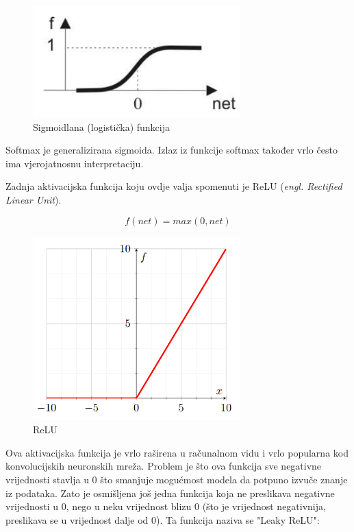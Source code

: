 \begin{figure}[H]
\centering
\includegraphics[width=8cm]{img/Sigmoid.png}
\caption{Sigmoidlana (logistička) funkcija}
\label{img:sigmoid}
\end{figure}

Softmax je generalizirana sigmoida. Izlaz iz funkcije softmax također vrlo često ima vjerojatnosnu interpretaciju. 

Zadnja aktivacijska funkcija koju ovdje valja spomenuti je ReLU (\textit{engl. Rectified Linear Unit}). 

\begin{equation}
f(net) = max(0, net)
\label{eq:relu}
\end{equation}

\begin{figure}[H]
\centering
\includegraphics[width=8cm]{img/ReLU.png}
\caption{ReLU}
\label{img:relu}
\end{figure}

Ova aktivacijska funkcija je vrlo raširena u računalnom vidu i vrlo popularna kod konvolucijskih neuronskih mreža. Problem je što ova funkcija sve negativne vrijednosti stavlja u $0$ što smanjuje mogućmost modela da potpuno izvuče znanje iz podataka. Zato je osmišljena još jedna funkcija koja ne preslikava negativne vrijednosti u 0, nego u neku vrijednost blizu $0$ (što je vrijednost negativnija, preslikava se u vrijednost dalje od $0$). Ta funkcija naziva se "Leaky ReLU":

